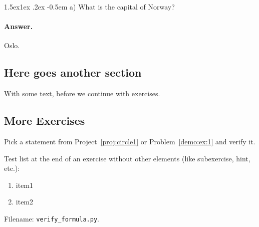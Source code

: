 \documentclass[%
oneside,                 %
final,                   %
10pt]{article}
\makeatletter
\newenvironment{doconceexercise}{}{}
\newcounter{doconceexercisecounter}
\newcommand\subex{\@startsection{paragraph}{4}{\z@}%
                  {1.5ex\@plus1ex \@minus.2ex}%
                  {-0.5em}%
                  {\normalfont\normalsize\bfseries}}
\theoremstyle{definition}
\makeatother
\begin{document}
\begin{enumerate}
\begin{doconceexercise}

\subex{a)}
What is the capital of Norway?

\paragraph{Answer.}
Oslo.

\end{doconceexercise}

\subsection{Here goes another section}

With some text, before we continue with exercises.

\subsection{More Exercises}

\begin{doconceexercise}

                             
\label{exer:some:formula}

Pick a statement from Project~\vref{proj:circle1} or Problem~\vref{demo:ex:1}
and verify it.

Test list at the end of an exercise without other elements (like subexercise,
hint, etc.):

\begin{enumerate}
\item item1

\item item2
\end{enumerate}

\noindent
\noindent Filename: \Verb!verify_formula.py!.

\end{doconceexercise}

\begin{doconceexercise}

                             

\end{doconceexercise}
\end{enumerate}
\end{document}
